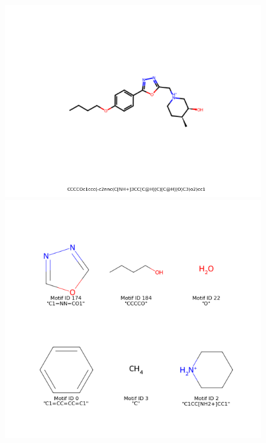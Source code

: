 \documentclass{article}
\begin{document}
\begin{figure}[h]
\includegraphics[width=1.0\textwidth]{./img/mgraph1.png}
\includegraphics[width=1.0\textwidth]{./img/mgraph2.png}

\end{figure}
\end{document}
